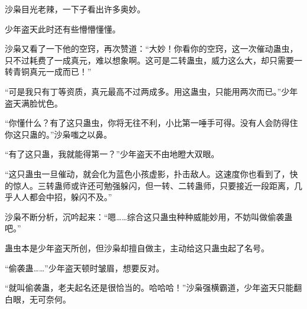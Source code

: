 \begin{this_body}
沙枭目光老辣，一下子看出许多奥妙。

少年盗天此时还有些懵懵懂懂。

沙枭又看了一下他的空窍，再次赞道：“大妙！你看你的空窍，这一次催动蛊虫，只不过耗费了一成真元，难以想象啊。这可是二转蛊虫，威力这么大，却只需要一转青铜真元一成而已！”

“可是我只有丁等资质，真元最高不过两成多。用这蛊虫，只能用两次而已。”少年盗天满脸忧色。

“你懂什么？有了这只蛊虫，你将无往不利，小比第一唾手可得。没有人会防得住你这只蛊的。”沙枭嗤之以鼻。

“有了这只蛊，我就能得第一？”少年盗天不由地瞪大双眼。

“这只蛊虫一旦催动，就会化为蓝色小孩虚影，扑击敌人。这速度你也看到了，快的惊人。三转蛊师或许还可勉强躲闪，但一转、二转蛊师，只要接近一段距离，几乎人人都会中招，躲闪不及。”

沙枭不断分析，沉吟起来：“嗯……综合这只蛊虫种种威能妙用，不妨叫做偷袭蛊吧。”

蛊虫本是少年盗天所创，但沙枭却擅自做主，主动给这只蛊虫起了名号。

“偷袭蛊……”少年盗天顿时皱眉，想要反对。

“就叫偷袭蛊，老夫起名还是很恰当的。哈哈哈！”沙枭强横霸道，少年盗天只能翻白眼，无可奈何。

\end{this_body}

